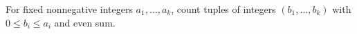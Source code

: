 For fixed nonnegative integers $a_1,\ldots,a_k$, count tuples of integers $(b_1,\ldots,b_k)$ with $0\le b_i\le a_i$ and even sum.
